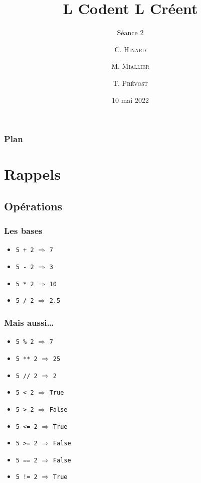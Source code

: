 \documentclass{beamer}
\title %
{L Codent L Créent}
\subtitle{Séance 2}
\author[ENSTA Bretagne] %
{C. \textsc{Hinard} \and M. \textsc{Miallier} \and T. \textsc{Prévost}}
\institute[] %
{
  ENSTA Bretagne
  \and
  Collège Croas ar Pennoc
}
\date[Séance 2] %
{10 mai 2022}
\begin{document}
\frame{\titlepage}


\begin{frame}
\frametitle{Plan}
\tableofcontents
\end{frame}


\section{Rappels}\label{sec:rappels}
   \subsection{Opérations}\label{subsec:operations}

\begin{frame}
\frametitle{Les bases}

\begin{itemize}
    \item<1-> \texttt{5 + 2} $\Longrightarrow$ \pause \texttt{7} \pause
    \item<2-> \texttt{5 - 2} $\Longrightarrow$ \pause \texttt{3} \pause
    \item<3-> \texttt{5 * 2} $\Longrightarrow$ \pause \texttt{10} \pause
    \item<4-> \texttt{5 / 2} $\Longrightarrow$ \pause \texttt{2.5}

\end{itemize}
\end{frame}

\begin{frame}
\frametitle{Mais aussi\dots}

\begin{itemize}%
   \item<1-> \texttt{5 \% 2} $\Longrightarrow$ \pause \texttt{7} \pause
   \item<2-> \texttt{5 ** 2} $\Longrightarrow$ \pause \texttt{25} \pause
   \item<3-> \texttt{5 // 2} $\Longrightarrow$ \pause \texttt{2} \pause
   \item<4-> \texttt{5 < 2} $\Longrightarrow$ \pause \texttt{True} \pause
   \item<5-> \texttt{5 > 2} $\Longrightarrow$ \pause \texttt{False} \pause
   \item<6-> \texttt{5 <= 2} $\Longrightarrow$ \pause \texttt{True} \pause
   \item<7-> \texttt{5 >= 2} $\Longrightarrow$ \pause \texttt{False} \pause
   \item<8-> \texttt{5 == 2} $\Longrightarrow$ \pause \texttt{False} \pause
   \item<9-> \texttt{5 != 2} $\Longrightarrow$ \pause \texttt{True} \pause
\end{itemize}
\end{frame}
\end{document}
